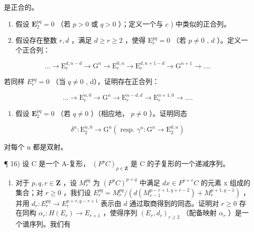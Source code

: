 是正合的。

\begin{enumerate}
\def\labelenumi{\alph{enumi})}
\setcounter{enumi}{3}
\item
  假设 \(\mathbf{E}_2^{pq} = 0\) （若 \(p > 0\) 或 \(q > 0\) ）；定义一个与 \(c\) ) 中类似的正合列。
\item
  假设存在整数 \(r, d\) ，满足 \(d \geqslant r \geqslant 2\) ，使得 \(\mathrm{E}_{r}^{pq} = 0\) （若 \(p \neq 0\) , \(d\) ）。定义一个正合列：
\end{enumerate}

\[
\dots \rightarrow \mathrm{E} _ {r} ^ {d, n - d} \rightarrow \mathrm{G} ^ {n} \rightarrow \mathrm{E} _ {r} ^ {0, n} \rightarrow \mathrm{E} _ {r} ^ {d, n + 1 - d} \rightarrow \mathrm{G} ^ {n + 1} \rightarrow \dots .
\]

若同样 \(E_{r}^{pq} = 0\) （当 \(q \neq 0\) , d），证明存在正合列：

\[
\dots \rightarrow \mathrm{E} _ {r} ^ {n, 0} \rightarrow \mathrm{G} ^ {n} \rightarrow \mathrm{E} _ {r} ^ {n - d, d} \rightarrow \mathrm{E} _ {r} ^ {n + 1, 0} \rightarrow \dots .
\]

\begin{enumerate}
\def\labelenumi{\alph{enumi})}
\setcounter{enumi}{5}
\tightlist
\item
  假设 \(\mathbf{E}_2^{pq} = 0\) （若 \(q \neq 0\) ）（相应地， \(p \neq 0\) ）。证明同态
\end{enumerate}

\[
\delta^ {n}: \mathrm{E} _ {2} ^ {n, 0} \rightarrow \mathrm{G} ^ {n} (\text { resp. } \gamma^ {n}: \mathrm{G} ^ {n} \rightarrow \mathrm{E} _ {2} ^ {0, n})
\]

对每个 n 都是双射。

¶ 16) 设 C 是一个 A-复形， \((F^{p}C)_{p\in\mathbf{Z}}\) 是 C 的子复形的一个递减序列。

\begin{enumerate}
\def\labelenumi{\alph{enumi})}
\tightlist
\item
  对于 \(p,q,r\in\mathbf{Z}\) ，设 \(M_{r}^{pq}\) 为 \((F^{p}C)^{p+q}\) 中满足 \(dx\in F^{p+r}C\) 的元素 x 组成的集合；对 \(r\geqslant0\) ，我们设 \(E_{r}^{pq}=M_{r}^{pq}/(d(M_{r-1}^{p-r+1,q+r-2})+M_{r}^{p+1,q-1})\) ，并用 \(d_{r}:E_{r}^{pq}\to E_{r}^{p+r,q-r+1}\) 表示由 \(d\) 通过取商得到的同态。证明对 \(r\geqslant0\) 存在同构 \(\alpha_{r}:H(E_{r})\to E_{r+1}\) ，使得序列 \((E_{r},d_{r})_{r\geqslant2}\) （配备映射 \(\alpha_{r}\) ）是一个谱序列。我们有
\end{enumerate}

